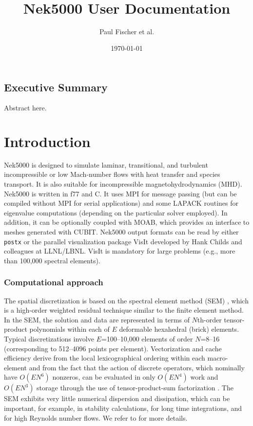 \documentclass[11pt]{report}              %
\title{Nek5000 User Documentation}    %
\author{Paul Fischer et al.}              %
\date{\today}                           %
\begin{document}

\maketitle
\clearpage
\thispagestyle{empty}
\tableofcontents
\clearpage

\section*{Executive Summary} 


Abstract here.

\newpage

\setcounter{page}{1}

\chapter{Introduction}

Nek5000 is designed to simulate laminar, transitional, and turbulent
incompressible or low Mach-number flows with heat transfer and species
transport. It is also suitable for incompressible magnetohydrodynamics
(MHD). Nek5000 is written in f77 and C. It uses MPI for message passing
(but can be compiled without MPI for serial applications)
and some LAPACK routines for eigenvalue computations (depending on
the particular solver employed).  In addition, it can be optionally
coupled with MOAB, which provides an interface to meshes generated with 
CUBIT. Nek5000 output formats can be read by either {\tt postx} or the parallel visualization 
package VisIt developed by Hank Childs and colleagues at LLNL/LBNL.
VisIt is mandatory for large problems (e.g., more than 100,000 
spectral elements).
\subsection*{Computational approach}
The spatial discretization is based on 
the spectral element method (SEM) \cite{pat84}, which is a high-order 
weighted residual technique similar to the finite element method.   
In the SEM, the solution and data are represented in terms of 
$N$th-order tensor-product polynomials within each of $E$ deformable 
hexahedral (brick) elements. Typical discretizations involve $E$=100--10,000 elements of order 
$N$=8--16 (corresponding to 512--4096 points per element).
Vectorization and cache efficiency derive from the local lexicographical
ordering within each macro-element and from the fact that the action of
discrete operators, which nominally have $O(EN^6)$ nonzeros, can be evaluated
in only $O(EN^4)$ work and $O(EN^3)$ storage through the use of 
tensor-product-sum factorization \cite{sao80}.   The SEM exhibits 
very little numerical dispersion and dissipation, which can be important, 
for example, in stability calculations, for long time integrations, 
and for high Reynolds number flows. We refer to \cite{dfm02} for more
details.

\end{document}
